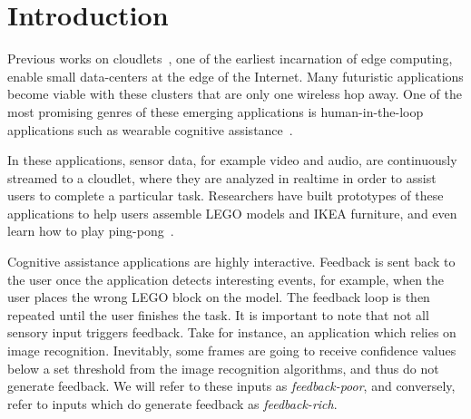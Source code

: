 \section{Introduction}

Previous works on cloudlets~\cite{Satya2009Case,Ha2013Impact}, one of the earliest incarnation of edge computing, enable small data-centers at the edge of the Internet. 
Many futuristic applications become viable with these clusters that are only one wireless hop away. 
One of the most promising genres of these emerging applications is human-in-the-loop applications such as wearable cognitive assistance~\cite{Ha2014Towards}. 

In these applications, sensor data, for example video and audio, are continuously streamed to a cloudlet, where they are analyzed in realtime in order to assist users to complete a particular task. 
Researchers have built prototypes of these applications to help users assemble LEGO models and IKEA furniture, and even learn how to play ping-pong~\cite{Satya2009Case,Chen2015Early}.

Cognitive assistance applications are highly interactive. 
Feedback is sent back to the user once the application detects interesting events, for example, when the user places the wrong LEGO block on the model.
The feedback loop is then repeated until the user finishes the task.
It is important to note that not all sensory input triggers feedback.
Take for instance, an application which relies on image recognition.
Inevitably, some frames are going to receive confidence values below a set threshold from the image recognition algorithms, and thus do not generate feedback.
We will refer to these inputs as \emph{feedback-poor}, and conversely, refer to inputs which do generate feedback as \emph{feedback-rich}.

